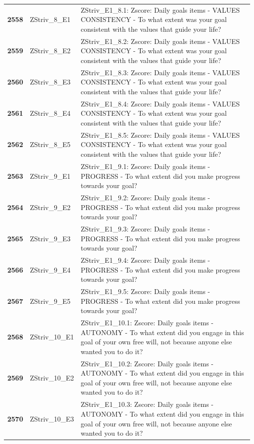 \documentclass[
  letterpaper,
  DIV=11,
  numbers=noendperiod]{scrartcl}
\begin{document}
\begin{longtable}[t]{>{}cll}
\textbf{2558} & ZStriv\_8\_E1 & ZStriv\_E1\_8.1: Zscore:  Daily goals items - VALUES CONSISTENCY - To what extent was your goal consistent with the values that guide your life?\\
\textbf{2559} & ZStriv\_8\_E2 & ZStriv\_E1\_8.2: Zscore:  Daily goals items - VALUES CONSISTENCY - To what extent was your goal consistent with the values that guide your life?\\
\textbf{2560} & ZStriv\_8\_E3 & ZStriv\_E1\_8.3: Zscore:  Daily goals items - VALUES CONSISTENCY - To what extent was your goal consistent with the values that guide your life?\\
\addlinespace
\textbf{2561} & ZStriv\_8\_E4 & ZStriv\_E1\_8.4: Zscore:  Daily goals items - VALUES CONSISTENCY - To what extent was your goal consistent with the values that guide your life?\\
\textbf{2562} & ZStriv\_8\_E5 & ZStriv\_E1\_8.5: Zscore:  Daily goals items - VALUES CONSISTENCY - To what extent was your goal consistent with the values that guide your life?\\
\textbf{2563} & ZStriv\_9\_E1 & ZStriv\_E1\_9.1: Zscore:  Daily goals items - PROGRESS - To what extent did you make progress towards your goal?\\
\textbf{2564} & ZStriv\_9\_E2 & ZStriv\_E1\_9.2: Zscore:  Daily goals items - PROGRESS - To what extent did you make progress towards your goal?\\
\textbf{2565} & ZStriv\_9\_E3 & ZStriv\_E1\_9.3: Zscore:  Daily goals items - PROGRESS - To what extent did you make progress towards your goal?\\
\addlinespace
\textbf{2566} & ZStriv\_9\_E4 & ZStriv\_E1\_9.4: Zscore:  Daily goals items - PROGRESS - To what extent did you make progress towards your goal?\\
\textbf{2567} & ZStriv\_9\_E5 & ZStriv\_E1\_9.5: Zscore:  Daily goals items - PROGRESS - To what extent did you make progress towards your goal?\\
\textbf{2568} & ZStriv\_10\_E1 & ZStriv\_E1\_10.1: Zscore:  Daily goals items - AUTONOMY - To what extent did you engage in this goal of your own free will, not because anyone else wanted you to do it?\\
\textbf{2569} & ZStriv\_10\_E2 & ZStriv\_E1\_10.2: Zscore:  Daily goals items - AUTONOMY - To what extent did you engage in this goal of your own free will, not because anyone else wanted you to do it?\\
\textbf{2570} & ZStriv\_10\_E3 & ZStriv\_E1\_10.3: Zscore:  Daily goals items - AUTONOMY - To what extent did you engage in this goal of your own free will, not because anyone else wanted you to do it?\\

\end{longtable}
\end{document}
